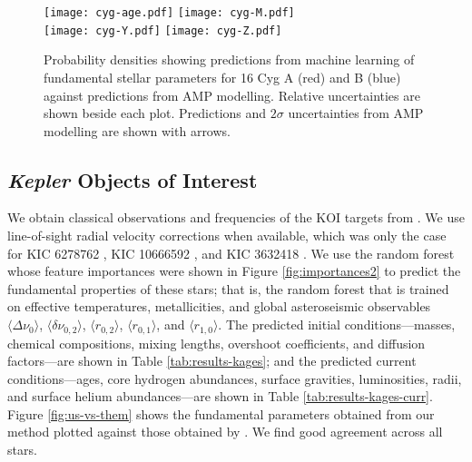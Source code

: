 \documentclass[manuscript,linenumbers]{aastex6}
\begin{document}
\begin{figure*}
    \centering
    \texttt{[image: cyg-age.pdf]}\hfill
    \texttt{[image: cyg-M.pdf]}\\
    \texttt{[image: cyg-Y.pdf]}\hfill
    \texttt{[image: cyg-Z.pdf]}
    \caption{Probability densities showing predictions from machine learning of fundamental stellar parameters for 16 Cyg A (red) and B (blue) against predictions from AMP modelling. Relative uncertainties are shown beside each plot. Predictions and $2\sigma$ uncertainties from AMP modelling are shown with arrows. \vspace*{5mm}
    \label{fig:16Cyg-hist}}
\end{figure*}


\subsection{\emph{Kepler} Objects of Interest}
We obtain classical observations and frequencies of the KOI targets from \citet{2016MNRAS.456.2183D}. We use line-of-sight radial velocity corrections when available, which was only the case for KIC 6278762 \citep{2002AJ....124.1144L}, KIC 10666592 \citep{2013AA...554A..84M}, and KIC 3632418 \citep{2006AstL...32..759G}. We use the random forest whose feature importances were shown in Figure \ref{fig:importances2} to predict the fundamental properties of these stars; that is, the random forest that is trained on effective temperatures, metallicities, and global asteroseismic observables $\langle \Delta\nu_0 \rangle$, $\langle \delta\nu_{0,2} \rangle$, $\langle r_{0,2} \rangle$, $\langle r_{0,1} \rangle$, and $\langle r_{1,0} \rangle$. The predicted initial conditions---masses, chemical compositions, mixing lengths, overshoot coefficients, and diffusion factors---are shown in Table \ref{tab:results-kages}; and the predicted current conditions---ages, core hydrogen abundances, surface gravities, luminosities, radii, and surface helium abundances---are shown in Table \ref{tab:results-kages-curr}. Figure \ref{fig:us-vs-them} shows the fundamental parameters obtained from our method plotted against those obtained by \citet[hereinafter KAGES]{2015MNRAS.452.2127S}. We find good agreement across all stars. 
\end{document}
